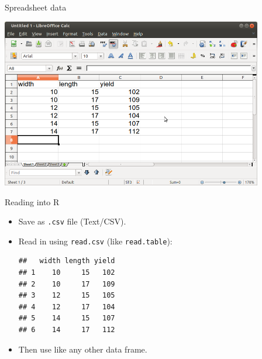 \begin{frame}[fragile]{Spreadsheet data}
  
  \includegraphics[width=4.5in]{myspread}
   
\end{frame}

\begin{frame}[fragile]{Reading into R}
  
  \begin{itemize}
  \item Save as \texttt{.csv} file (Text/CSV).
  \item Read in using \texttt{read.csv} (like \texttt{read.table}):
    
 
\begin{knitrout}
\color{fgcolor}\begin{kframe}
\begin{alltt}
\hlkwb{=}\hlstd{(}\hlstd{,}
\end{alltt}
\begin{verbatim}
##   width length yield
## 1    10     15   102
## 2    10     17   109
## 3    12     15   105
## 4    12     17   104
## 5    14     15   107
## 6    14     17   112
\end{verbatim}
\end{kframe}
\end{knitrout}

\item Then use like any other data frame.
  \end{itemize}
  
\end{frame}
